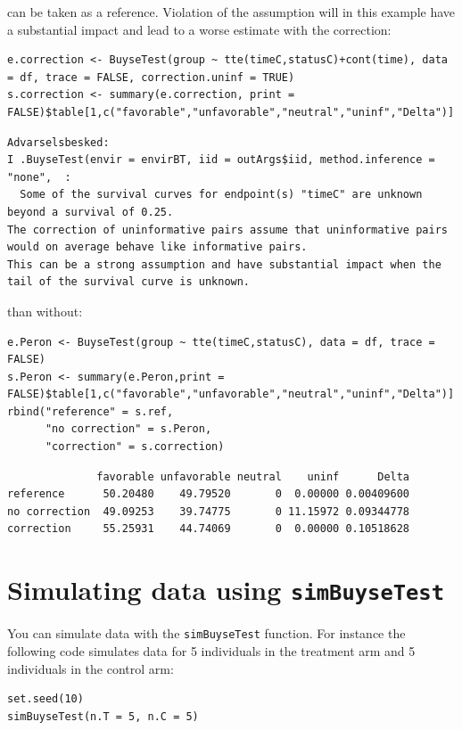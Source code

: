 \documentclass[12pt]{article}
\begin{document}
can be taken as a reference. Violation of the assumption will in this
example have a substantial impact and lead to a worse estimate with
the correction:
\lstset{language=r,label= ,caption= ,captionpos=b,numbers=none}
\begin{lstlisting}
e.correction <- BuyseTest(group ~ tte(timeC,statusC)+cont(time), data = df, trace = FALSE, correction.uninf = TRUE)
s.correction <- summary(e.correction, print = FALSE)$table[1,c("favorable","unfavorable","neutral","uninf","Delta")]
\end{lstlisting}

\begin{verbatim}
Advarselsbesked:
I .BuyseTest(envir = envirBT, iid = outArgs$iid, method.inference = "none",  :
  Some of the survival curves for endpoint(s) "timeC" are unknown beyond a survival of 0.25.
The correction of uninformative pairs assume that uninformative pairs would on average behave like informative pairs. 
This can be a strong assumption and have substantial impact when the tail of the survival curve is unknown.
\end{verbatim}


than without:
\lstset{language=r,label= ,caption= ,captionpos=b,numbers=none}
\begin{lstlisting}
e.Peron <- BuyseTest(group ~ tte(timeC,statusC), data = df, trace = FALSE)
s.Peron <- summary(e.Peron,print = FALSE)$table[1,c("favorable","unfavorable","neutral","uninf","Delta")]
rbind("reference" = s.ref,
      "no correction" = s.Peron,
      "correction" = s.correction)
\end{lstlisting}
\begin{verbatim}
              favorable unfavorable neutral    uninf      Delta
reference      50.20480    49.79520       0  0.00000 0.00409600
no correction  49.09253    39.74775       0 11.15972 0.09344778
correction     55.25931    44.74069       0  0.00000 0.10518628
\end{verbatim}


\clearpage

\section{Simulating data using \texttt{simBuyseTest}}
\label{sec:orga5c8b52}
You can simulate data with the \texttt{simBuyseTest} function. For instance
the following code simulates data for 5 individuals in the treatment
arm and 5 individuals in the control arm:
\lstset{language=r,label= ,caption= ,captionpos=b,numbers=none}
\begin{lstlisting}
set.seed(10)
simBuyseTest(n.T = 5, n.C = 5)
\end{lstlisting}
\end{document}
